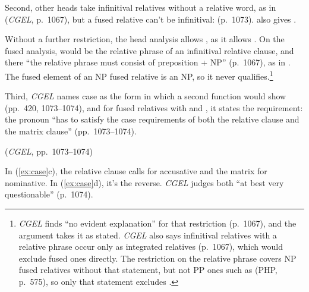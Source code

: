 Second, other heads take infinitival relatives without a relative word, as in  (\textit{CGEL}, p.~1067), but a fused relative can't be infinitival:  (p.~1073). \textcite[364]{kim-2017-free-relatives} also gives .

Without a further restriction, the head analysis allows , as it allows . On the fused analysis,  would be the relative phrase of an infinitival relative clause, and there \enquote{the relative phrase must consist of preposition + NP} (p.~1067), as in . The fused element of an NP fused relative is an NP, so it never qualifies.\footnote{\textit{CGEL} finds \enquote{no evident explanation} for that restriction (p.~1067), and the argument takes it as stated. \textit{CGEL} also says infinitival relatives with a relative phrase occur only as integrated relatives (p.~1067), which would exclude fused ones directly. The restriction on the relative phrase covers NP fused relatives without that statement, but not PP ones such as  (PHP, p.~575), so only that statement excludes .}

Third, \textit{CGEL} names case as the form in which a second function would show (pp.~420, 1073--1074), and for fused relatives with  and , it states the requirement: the pronoun \enquote{has to satisfy the case requirements of both the relative clause and the matrix clause} (pp.~1073--1074).

\ea\label{ex:case} (\textit{CGEL}, pp.~1073--1074)
\ea {}
\ex {}
\ex {}
\ex {}
\z\z

In (\ref{ex:case}c), the relative clause calls for accusative and the matrix for nominative. In (\ref{ex:case}d), it's the reverse. \textit{CGEL} judges both \enquote{at best very questionable} (p.~1074).

